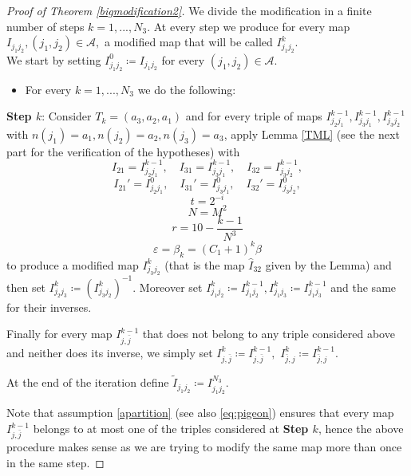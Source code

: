 \documentclass[11pt]{article}
\newcommand{\eps}{\varepsilon}
\theoremstyle{plain}
\theoremstyle{definition}
\numberwithin{equation}{section}
\begin{document}
\begin{proof}[Proof of Theorem \ref{bigmodification2}]
	\medskip
{}
	
	We divide the modification in a finite number of steps $k=1,...,N_3$. At every step we produce for every map $I_{j_1j_2}, (j_1,j_2)\in \mathcal{A},$ a modified map that will be called $I^k_{j_1j_2}.$  \\
	We start by setting $ I^0_{j_1j_2}\coloneqq I_{j_1j_2}$ for every $ (j_1,j_2)\in \mathcal{A}.$
	\begin{itemize}
		\item For every  $k=1,...,{N_3}$ we  do the following:
	\end{itemize}

\begin{tcolorbox}[colframe=white,colback=mygray]
	{\bf Step $k$}: Consider $T_k=(a_3,a_2,a_1)$ and for every triple of maps  $I^{k-1}_{j_{2}j_{1}},I^{k-1}_{j_{3}j_{1}},I^{k-1}_{j_{3}j_{2}}$ with $n(j_1)=a_1 , n(j_2)=a_2 ,n(j_3)=a_3$, 
	apply Lemma \ref{TML} (see the next part for the verification of the hypotheses) with 
	\[  I_{21}=I^{k-1}_{j_{2}j_{1}},\quad  I_{31}= I^{k-1}_{j_{3}j_{1}},\quad I_{32}= I^{k-1}_{j_{3}j_{2}},  \]
	\[  I_{21}'=I^{0}_{j_{2}j_{1}},\quad I_{31}'= I^{0}_{j_{3}j_{1}},\quad I_{32}'= I^{0}_{j_{3}j_{2}},  \]
	\[t=2^{-i}\]
	\[N=M^2\]
	\[r=10-\frac{k-1}{N^3}\]
	\[\eps=\beta_k=(C_1+1)^k\beta\]
	to produce a modified map $I^{k}_{j_{3}j_{2}}$ (that is the map  $\hat I_{32}$ given by the Lemma) and then set $I^{k}_{j_{2}j_{3}}\coloneqq (I^{k}_{j_{3}j_{2}})^{-1}$. Moreover   set $I^{k}_{j_1j_2}\coloneqq I^{k-1}_{j_1j_2},I^{k}_{j_1j_3}\coloneqq I^{k-1}_{j_1j_3}$ and the same for their inverses. 

	Finally for every map $I_{j,\bar j}^{k-1}$ that does not belong to any triple considered above and neither does its inverse,  we simply set $I_{j, \bar j}^{k}\coloneqq I_{j,\bar j}^{k-1},$ $I_{\bar j,  j}^{k}\coloneqq I_{\bar j, j}^{k-1}.$  
\end{tcolorbox}	


 At the end of the iteration define $ \widetilde I_{j_1j_2}\coloneqq I^{{N_3}}_{j_1j_2}$.



 Note that assumption \eqref{apartition} (see also \eqref{eq:pigeon})  ensures that every map $I^{k-1}_{j,\bar j}$ belongs to at most one of  the triples considered at \textbf{Step $k$}, hence the above procedure makes sense as we are trying to modify the same map more than once in the same step.

\medskip
{}
	

\end{proof}
\end{document}
